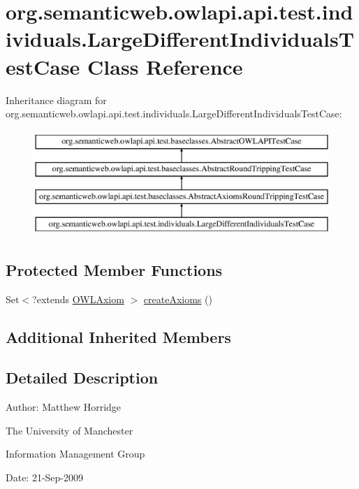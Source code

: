 \hypertarget{classorg_1_1semanticweb_1_1owlapi_1_1api_1_1test_1_1individuals_1_1_large_different_individuals_test_case}{\section{org.\-semanticweb.\-owlapi.\-api.\-test.\-individuals.\-Large\-Different\-Individuals\-Test\-Case Class Reference}
\label{classorg_1_1semanticweb_1_1owlapi_1_1api_1_1test_1_1individuals_1_1_large_different_individuals_test_case}
}
Inheritance diagram for org.\-semanticweb.\-owlapi.\-api.\-test.\-individuals.\-Large\-Different\-Individuals\-Test\-Case\-:\begin{figure}[H]
\begin{center}
\leavevmode
\includegraphics[height=4.000000cm]{classorg_1_1semanticweb_1_1owlapi_1_1api_1_1test_1_1individuals_1_1_large_different_individuals_test_case}
\end{center}
\end{figure}
\subsection*{Protected Member Functions}
\begin{DoxyCompactItemize}
\item 
Set$<$?extends \hyperlink{interfaceorg_1_1semanticweb_1_1owlapi_1_1model_1_1_o_w_l_axiom}{O\-W\-L\-Axiom} $>$ \hyperlink{classorg_1_1semanticweb_1_1owlapi_1_1api_1_1test_1_1individuals_1_1_large_different_individuals_test_case_a036b4af6cb7579660301df8974c0a451}{create\-Axioms} ()
\end{DoxyCompactItemize}
\subsection*{Additional Inherited Members}


\subsection{Detailed Description}
Author\-: Matthew Horridge\par
 The University of Manchester\par
 Information Management Group\par
 Date\-: 21-\/\-Sep-\/2009 

